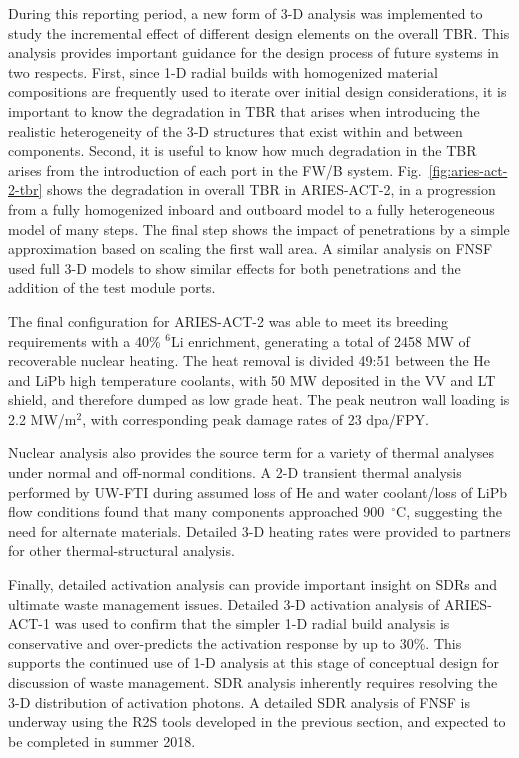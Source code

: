 During this reporting period, a new form of 3-D analysis was implemented to
study the incremental effect of different design elements on the overall
\gls{TBR}.  This analysis provides important guidance for the design process
of future systems in two respects.  First, since 1-D radial builds with
homogenized material compositions are frequently used to iterate over initial
design considerations, it is important to know the degradation in \gls{TBR}
that arises when introducing the realistic heterogeneity of the 3-D structures
that exist within and between components.  Second, it is useful to know how
much degradation in the \gls{TBR} arises from the introduction of each port in
the \gls{FW/B} system.  Fig.\ \ref{fig:aries-act-2-tbr} shows the degradation
in overall \gls{TBR} in ARIES-ACT-2, in a progression from a fully homogenized
inboard and outboard model to a fully heterogeneous model of many
steps. The final step shows the impact of penetrations by a
simple approximation based on scaling the first wall area.  A similar analysis
on FNSF used full 3-D models to show similar effects for both penetrations and
the addition of the test module ports.

The final configuration for ARIES-ACT-2 was able to meet its breeding
requirements with a 40\% $^6$Li enrichment, generating a total of 2458 MW of
recoverable nuclear heating.  The heat removal is divided 49:51 between the He
and LiPb high temperature coolants, with 50 MW deposited in the VV and LT
shield, and therefore dumped as low grade heat.  The peak neutron wall loading
is 2.2 MW/m$^2$, with corresponding peak damage rates of 23
dpa/FPY.

Nuclear analysis also provides the source term for a variety of thermal
analyses under normal and off-normal conditions.  A 2-D transient thermal
analysis performed by \gls{UW-FTI} during assumed loss of He and water
coolant/loss of LiPb flow conditions found that many components approached
900\ $^\circ$C, suggesting the need for alternate materials.  Detailed 3-D
heating rates were provided to partners for other thermal-structural analysis.

Finally, detailed activation analysis can provide important insight on
\glspl{SDR} and ultimate waste management issues.  Detailed 3-D activation
analysis of ARIES-ACT-1 was used to confirm that the simpler 1-D radial build
analysis is conservative and over-predicts the activation response by up to
30\%. This supports the continued use of 1-D analysis at
this stage of conceptual design for discussion of waste management.  \gls{SDR}
analysis inherently requires resolving the 3-D distribution of activation
photons.  A detailed \gls{SDR} analysis of FNSF is underway using the
\gls{R2S} tools developed in the previous section, and expected to be
completed in summer 2018.

